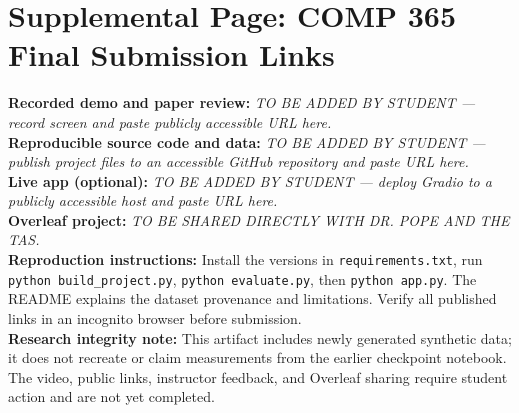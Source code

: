 \documentclass[sigconf,anonymous]{acmart}
\begin{document}
\section*{Supplemental Page: COMP 365 Final Submission Links}
\textbf{Recorded demo and paper review:} \emph{TO BE ADDED BY STUDENT --- record screen and paste publicly accessible URL here.}\\[8pt]
\textbf{Reproducible source code and data:} \emph{TO BE ADDED BY STUDENT --- publish project files to an accessible GitHub repository and paste URL here.}\\[8pt]
\textbf{Live app (optional):} \emph{TO BE ADDED BY STUDENT --- deploy Gradio to a publicly accessible host and paste URL here.}\\[8pt]
\textbf{Overleaf project:} \emph{TO BE SHARED DIRECTLY WITH DR. POPE AND THE TAS.}\\[8pt]
\textbf{Reproduction instructions:} Install the versions in \texttt{requirements.txt}, run \texttt{python build\_project.py}, \texttt{python evaluate.py}, then \texttt{python app.py}. The README explains the dataset provenance and limitations. Verify all published links in an incognito browser before submission.\\[8pt]
\textbf{Research integrity note:} This artifact includes newly generated synthetic data; it does not recreate or claim measurements from the earlier checkpoint notebook. The video, public links, instructor feedback, and Overleaf sharing require student action and are not yet completed.
\end{document}
